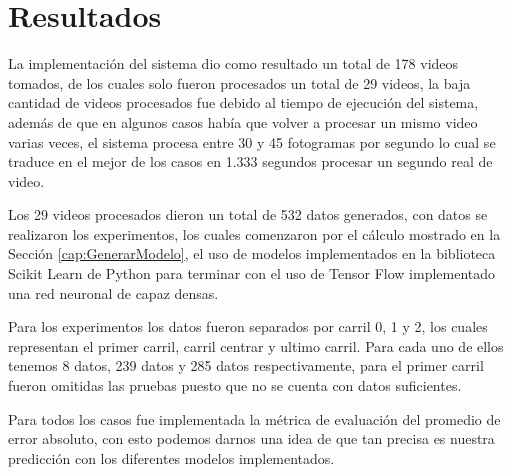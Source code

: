 \chapter{Resultados}

La implementación del sistema dio como resultado un total de 178 videos tomados, de los cuales solo fueron procesados un total de 29 videos, la baja cantidad de videos procesados fue debido al tiempo de ejecución del sistema, además de que en algunos casos había que volver a procesar un mismo video varias veces, el sistema procesa entre 30 y 45 fotogramas por segundo lo cual se traduce en el mejor de los casos en 1.333 segundos procesar un segundo real de video.

Los 29 videos procesados dieron un total de 532 datos generados, con datos se realizaron los experimentos, los cuales comenzaron por el cálculo mostrado en la Sección \ref{cap:GenerarModelo}, el uso de modelos implementados en la biblioteca Scikit Learn de Python para terminar con el uso de Tensor Flow implementado una red neuronal de capaz densas.

Para los experimentos los datos fueron separados por carril 0, 1 y 2, los cuales representan el primer carril, carril centrar y ultimo carril. Para cada uno de ellos tenemos 8 datos, 239 datos y 285 datos respectivamente, para el primer carril fueron omitidas las pruebas puesto que no se cuenta con datos suficientes.

Para todos los casos fue implementada la métrica de evaluación del promedio de error absoluto, con esto podemos darnos una idea de que tan precisa es nuestra predicción con los diferentes modelos implementados.






